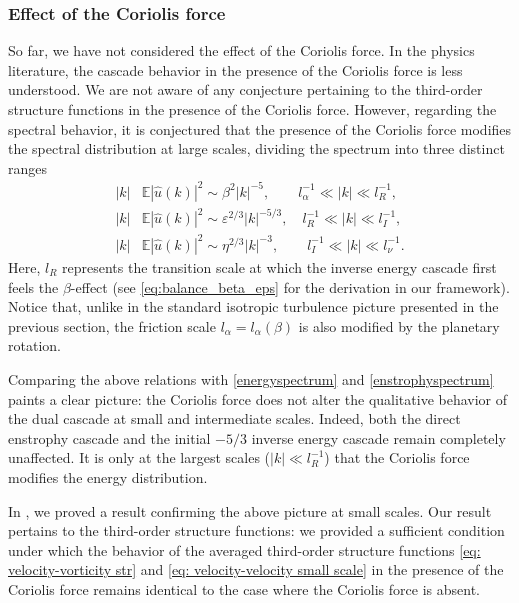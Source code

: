 \documentclass[11pt,a4paper]{article}
\numberwithin{equation}{section}
\numberwithin{theorem}{section}
\numberwithin{remark}{section}
\numberwithin{definition}{section}
\begin{document}
\subsubsection{Effect of the Coriolis force}

So far, we have not considered the effect of the Coriolis force. In the physics literature, the cascade behavior in the presence of the Coriolis force is less understood. We are not aware of any conjecture pertaining to the third-order structure functions in the presence of the Coriolis force. However, regarding the spectral behavior, it is conjectured \cite{chekhlov, Cost2, Cope, galerpin1, huang2, rhines, vallis1} 
 that the presence of the Coriolis force modifies the spectral distribution at large scales, dividing the spectrum into three distinct ranges
\begin{subequations}
\begin{align}
    |k|&\mathbb{E}|\hat{u}(k)|^2 \sim \beta^2|k|^{-5}, \quad\quad l^{-1}_{\alpha} \ll |k| \ll l^{-1}_{R}, \label{energyspectrumCor_zonal}\\
    |k|&\mathbb{E}|\hat{u}(k)|^2 \sim \varepsilon^{2/3}|k|^{-5/3}, \quad l^{-1}_{R} \ll |k| \ll l^{-1}_I, \label{energyspectrumCor_iso}\\
    |k|&\mathbb{E}|\hat{u}(k)|^2 \sim \eta^{2/3}|k|^{-3}, \quad\quad l^{-1}_{I} \ll |k| \ll l^{-1}_\nu. \label{enstrophyspectrumCor}
\end{align}
\end{subequations}
Here, $l_{R}$ represents the transition scale at which the inverse energy cascade first feels the $\beta$-effect (see \eqref{eq:balance_beta_eps} for the  derivation in our framework). Notice that, unlike in the standard isotropic turbulence picture presented in the previous section, the friction scale $l_{\alpha}=l_{\alpha}(\beta)$ is also modified by the planetary rotation.

Comparing the above relations with \eqref{energyspectrum} and \eqref{enstrophyspectrum} paints a clear picture: the Coriolis force does not alter the qualitative behavior of the dual cascade at small and intermediate scales. Indeed, both the direct enstrophy cascade and the initial $-5/3$ inverse energy cascade remain completely unaffected. It is only at the largest scales ($|k| \ll l_R^{-1}$) that the Coriolis force modifies the energy distribution.

In \cite{YuriAmiraliGigliola}, we proved a result confirming the above picture at small scales. Our result pertains to the third-order structure functions: we provided a sufficient condition under which the behavior of the averaged third-order structure functions \eqref{eq: velocity-vorticity str} and \eqref{eq: velocity-velocity small scale} in the presence of the Coriolis force remains identical to the case where the Coriolis force is absent.
\end{document}
